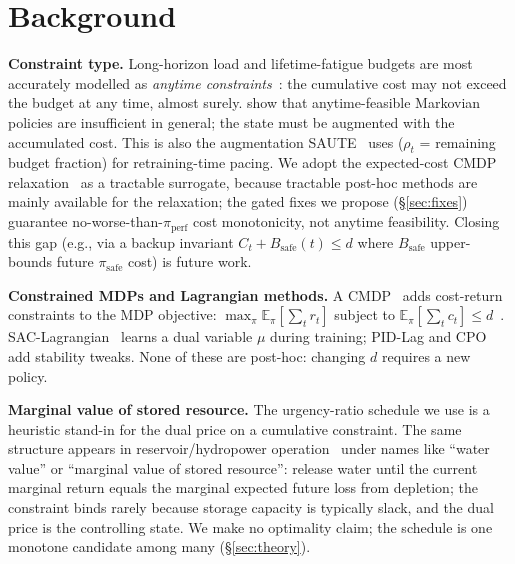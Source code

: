 \documentclass{article}
\begin{document}
\section{Background}
\label{sec:background}

\textbf{Constraint type.}
Long-horizon load and lifetime-fatigue budgets are most accurately modelled as \emph{anytime constraints}~\citep{mcmahan2024anytime}: the cumulative cost may not exceed the budget at any time, almost surely.
\citet{mcmahan2024anytime} show that anytime-feasible Markovian policies are insufficient in general; the state must be augmented with the accumulated cost.
This is also the augmentation SAUTE~\citep{sootla2022saute} uses ($\rho_t$ = remaining budget fraction) for retraining-time pacing.
We adopt the expected-cost CMDP relaxation~\citep{altman1999constrained, ray2019safetygym} as a tractable surrogate, because tractable post-hoc methods are mainly available for the relaxation; the gated fixes we propose (\S\ref{sec:fixes}) guarantee no-worse-than-$\pi_{\mathrm{perf}}$ cost monotonicity, not anytime feasibility.
Closing this gap (e.g., via a backup invariant $C_t + B_{\mathrm{safe}}(t)\!\le\!d$ where $B_{\mathrm{safe}}$ upper-bounds future $\pi_{\mathrm{safe}}$ cost) is future work.

\textbf{Constrained MDPs and Lagrangian methods.}
A CMDP~\citep{altman1999constrained} adds cost-return constraints to the MDP objective: $\max_\pi \mathbb{E}_\pi[\sum_t r_t]$ subject to $\mathbb{E}_\pi[\sum_t c_t] \leq d$~\citep{ray2019safetygym, achiam2017cpo}.
SAC-Lagrangian~\citep{stooke2020responsive} learns a dual variable $\mu$ during training; PID-Lag and CPO~\citep{achiam2017cpo} add stability tweaks.
None of these are post-hoc: changing $d$ requires a new policy.

\textbf{Marginal value of stored resource.}
The urgency-ratio schedule we use is a heuristic stand-in for the dual price on a cumulative constraint.
The same structure appears in reservoir/hydropower operation~\citep{tilmant2008water, you2008hedging} under names like ``water value'' or ``marginal value of stored resource'': release water until the current marginal return equals the marginal expected future loss from depletion; the constraint binds rarely because storage capacity is typically slack, and the dual price is the controlling state.
We make no optimality claim; the schedule is one monotone candidate among many (\S\ref{sec:theory}).
\end{document}
